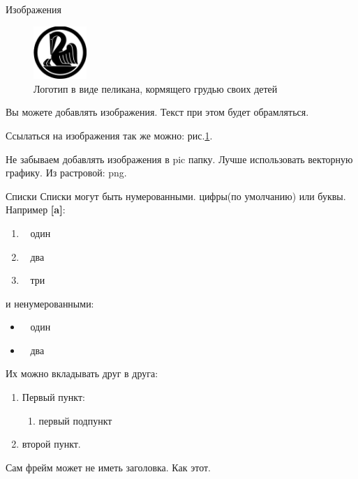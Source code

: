 \documentclass{beamer}
\newcommand{\рис}[1]{рис.\ref{#1}}
\newcommand{\Рис}[1]{Рис.\ref{#1}}
\newcommand{\таблицa}[1]{таблица~№\ref{#1}} %
\newcommand{\таблицы}[1]{таблицы~№\ref{#1}} %
\newcommand{\таблице}[1]{таблице~№\ref{#1}} %
\newcommand{\таблицу}[1]{таблицу~№\ref{#1}} %
\newcommand{\таблицей}[1]{таблицей~№\ref{#1}} %
\newcommand{\Таблицa}[1]{Таблица~№\ref{#1}} %
\newcommand{\Таблицы}[1]{Таблицы~№\ref{#1}} %
\newcommand{\Таблице}[1]{Таблице~№\ref{#1}} %
\newcommand{\Таблицу}[1]{Таблицу~№\ref{#1}} %
\newcommand{\Таблицей}[1]{Таблицей~№\ref{#1}} %
\begin{document}
\begin{frame}{Изображения}
	\begin{figure}
		\includegraphics[width=2cm]{../pic/kib_old_logo.png}
		\caption{Логотип в виде пеликана, кормящего грудью своих детей}
		\label{figure:pelican_1}
	\end{figure}
	Вы можете добавлять изображения.
	Текст при этом будет обрамляться.
	
	Ссылаться на изображения так же можно: \рис{figure:pelican_1}.
	
	Не забываем добавлять изображения в pic папку.
	Лучше использовать векторную графику. 
	Из растровой: png.
\end{frame}

\begin{frame}{Списки}
	Списки могут быть нумерованными. цифры(по умолчанию) или буквы. Например \textbf{[a]}:
	\begin{enumerate}[a]
		\item~ один
		\item~ два
		\item~ три
	\end{enumerate}
	и ненумерованными:
	\begin{itemize}
		\item~ один
		\item~ два
	\end{itemize}
	Их можно вкладывать друг в друга:
	\begin{enumerate}
		\item Первый пункт:
		\begin{enumerate}
			\item первый подпункт
		\end{enumerate}
		\item второй пункт.
	\end{enumerate}
\end{frame}

\begin{frame}
	Сам фрейм может не иметь заголовка. Как этот.
\end{frame}
\end{document}
